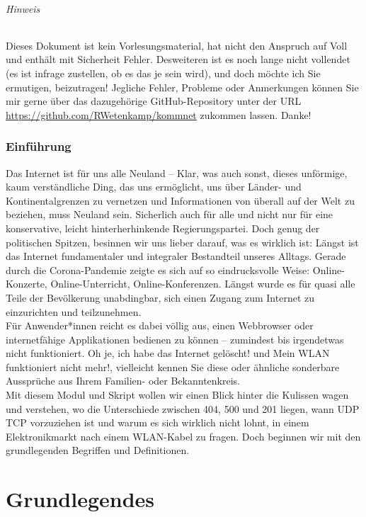 \documentclass[11pt,a4paper]{scrartcl}
\begin{document}
\paragraph{Hinweis}
Dieses Dokument ist kein Vorlesungsmaterial, hat nicht den Anspruch auf {Voll} und enthält mit Sicherheit Fehler. Desweiteren ist es noch lange nicht vollendet (es ist infrage zustellen, ob es das je sein wird), und doch möchte ich Sie ermutigen, beizutragen! Jegliche Fehler, Probleme oder Anmerkungen können Sie mir gerne über das dazugehörige GitHub-Repository unter der URL \url{https://github.com/RWetenkamp/kommnet} zukommen lassen. Danke!
\pagebreak
\section*{Einführung}
Das Internet ist für uns alle Neuland -- Klar, was auch sonst, dieses unförmige, kaum verständliche Ding, das uns ermöglicht, uns über Länder- und Kontinentalgrenzen zu vernetzen und Informationen von überall auf der Welt zu beziehen, muss Neuland sein. Sicherlich auch für alle und nicht nur für eine konservative, leicht hinterherhinkende Regierungspartei. Doch genug der politischen Spitzen, besinnen wir uns lieber darauf, was es wirklich ist: Längst ist das Internet fundamentaler und integraler Bestandteil unseres Alltags. Gerade durch die Corona-Pandemie zeigte es sich auf so eindrucksvolle Weise: Online-Konzerte, Online-Unterricht, Online-Konferenzen. Längst wurde es für quasi alle Teile der Bevölkerung unabdingbar, sich einen Zugang zum Internet zu einzurichten und teilzunehmen. \\
Für Anwender*innen reicht es dabei völlig aus, einen Webbrowser oder internetfähige Applikationen bedienen zu können -- zumindest bis irgendetwas nicht funktioniert. {\glqq}Oh je, ich habe das Internet gelöscht!{\grqq} und {\glqq}Mein WLAN funktioniert nicht mehr!{\grqq}, vielleicht kennen Sie diese oder ähnliche sonderbare Aussprüche aus Ihrem Familien- oder Bekanntenkreis. \\
Mit diesem Modul und Skript wollen wir einen Blick hinter die Kulissen wagen und verstehen, wo die Unterschiede zwischen 404, 500 und 201 liegen, wann UDP TCP vorzuziehen ist und warum es sich wirklich nicht lohnt, in einem Elektronikmarkt nach einem WLAN-Kabel zu fragen. Doch beginnen wir mit den grundlegenden Begriffen und Definitionen.
\part{Grundlegendes}
\end{document}
